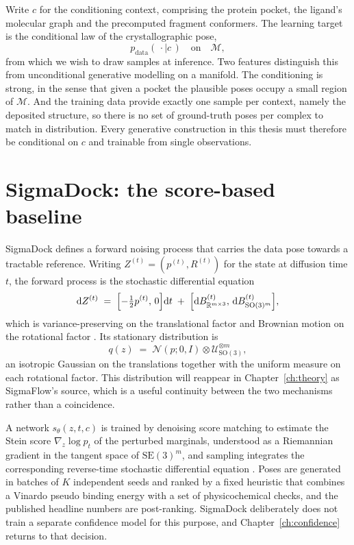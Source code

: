 \documentclass[11pt,a4paper]{report}
\theoremstyle{plain}
\theoremstyle{definition}
\theoremstyle{remark}
\newcommand{\R}{\mathbb{R}}
\newcommand{\SOthree}{\mathrm{SO}(3)}
\newcommand{\SEthree}{\mathrm{SE}(3)}
\newcommand{\Mfd}{\mathcal{M}}
\newcommand{\dif}{\mathrm{d}}
\newcommand{\Haar}{\mathcal{U}_{\SOthree}}
\newcommand{\ctx}{c}
\newcommand{\Rot}{R}
\begin{document}
Write $\ctx$ for the conditioning context, comprising the protein pocket, the
ligand's molecular graph and the precomputed fragment conformers. The learning
target is the conditional law of the crystallographic pose,
\begin{equation}
  p_{\mathrm{data}}(\,\cdot \mid \ctx\,) \quad\text{on}\quad \Mfd ,
\end{equation}
from which we wish to draw samples at inference. Two features distinguish this
from unconditional generative modelling on a manifold. The conditioning is
strong, in the sense that given a pocket the plausible poses occupy a small
region of $\Mfd$. And the training data provide exactly one sample per
context, namely the deposited structure, so there is no set of ground-truth
poses per complex to match in distribution. Every generative construction in
this thesis must therefore be conditional on $\ctx$ and trainable from single
observations.

\section{SigmaDock: the score-based baseline}
\label{sec:sigmadock}

SigmaDock defines a forward noising process that carries the data pose towards
a tractable reference. Writing $Z^{(t)} = (p^{(t)}, \Rot^{(t)})$ for the state
at diffusion time $t$, the forward process is the stochastic differential
equation
\begin{equation}
  \dif Z^{(t)}
  \;=\; \Bigl[-\tfrac12 p^{(t)},\, 0\Bigr]\dif t
   \;+\; \Bigl[\dif B^{(t)}_{\R^{m\times 3}},\, \dif B^{(t)}_{\SOthree^{m}}\Bigr],
  \label{eq:forward-sde}
\end{equation}
which is variance-preserving on the translational factor and Brownian motion
on the rotational factor \citep{yim2023se3,leach2022so3}. Its stationary
distribution is
\begin{equation}
  q(z) \;=\; \mathcal{N}(p;0,I) \otimes \Haar^{\otimes m},
  \label{eq:stationary}
\end{equation}
an isotropic Gaussian on the translations together with the uniform measure on
each rotational factor. This distribution will reappear in
Chapter~\ref{ch:theory} as SigmaFlow's source, which is a useful continuity
between the two mechanisms rather than a coincidence.

A network $s_\theta(z,t,\ctx)$ is trained by denoising score matching
\citep{vincent2011connection,song2019ncsn} to estimate the Stein score
$\nabla_z \log p_t$ of the perturbed marginals, understood as a Riemannian
gradient in the tangent space of $\SEthree^{m}$, and sampling integrates the
corresponding reverse-time stochastic differential equation
\citep{song2021sde}. Poses are generated in batches of $K$ independent seeds
and ranked by a fixed heuristic that combines a Vinardo pseudo binding energy
\citep{quiroga2016vinardo} with a set of physicochemical checks, and the
published headline numbers are post-ranking. SigmaDock deliberately does not
train a separate confidence model for this purpose, and
Chapter~\ref{ch:confidence} returns to that decision.
\end{document}
